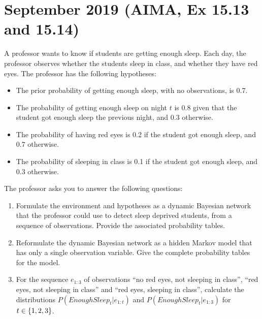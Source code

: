 \documentclass[11pt, a4paper]{article}
\begin{document}
\newpage

\section{September 2019 (AIMA, Ex 15.13 and 15.14)}

A professor wants to know if students are getting enough sleep. Each day, the professor observes whether the students sleep in class, and whether they have red eyes. The professor has the following hypotheses:
\begin{itemize}
    \item The prior probability of getting enough sleep, with no observations, is \num{0.7}.
    \item The probability of getting enough sleep on night $t$ is \num{0.8} given that the student got enough sleep the previous night, and \num{0.3} otherwise.
    \item The probability of having red eyes is \num{0.2} if the student got enough sleep, and \num{0.7} otherwise.
    \item The probability of sleeping in class is \num{0.1} if the student got enough sleep, and \num{0.3} otherwise.
\end{itemize}
The professor asks you to answer the following questions:

\begin{enumerate}
    \item Formulate the environment and hypotheses as a dynamic Bayesian network that the professor could use to detect sleep deprived students, from a sequence of observations. Provide the associated probability tables.

    \item Reformulate the dynamic Bayesian network as a hidden Markov model that has only a single observation variable. Give the complete probability tables for the model.

    \item For the sequence $e_{1:3}$ of observations \enquote{no red eyes, not sleeping in class}, \enquote{red eyes, not sleeping in class} and
    \enquote{red eyes, sleeping in class}, calculate the distributions $P(EnoughSleep_t | e_{1:t})$ and $P(EnoughSleep_t | e_{1:3})$ for $t \in \{1, 2, 3\}$.
\end{enumerate}

\newpage

\startquiz
\end{document}
